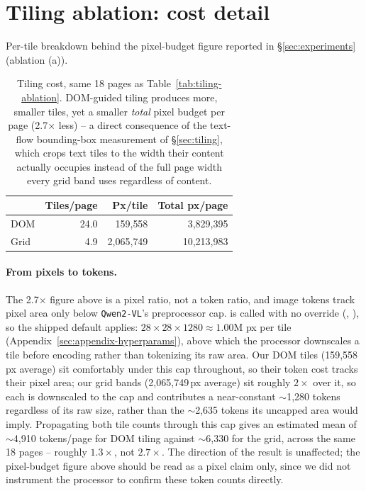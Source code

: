 \section{Tiling ablation: cost detail}
\label{sec:appendix-tiling-cost}

Per-tile breakdown behind the pixel-budget figure reported in \S\ref{sec:experiments} (ablation (a)).

\begin{table}[h]
\centering
\small
\begin{tabular}{@{}lrrr@{}}
\toprule
 & Tiles/page & Px/tile & Total px/page \\
\midrule
DOM  & 24.0 & 159{,}558 & 3{,}829{,}395 \\
Grid & 4.9  & 2{,}065{,}749 & 10{,}213{,}983 \\
\bottomrule
\end{tabular}
\caption{Tiling cost, same 18 pages as Table~\ref{tab:tiling-ablation}. DOM-guided tiling produces more, smaller tiles, yet a smaller \emph{total} pixel budget per page (2.7$\times$ less) -- a direct consequence of the text-flow bounding-box measurement of \S\ref{sec:tiling}, which crops text tiles to the width their content actually occupies instead of the full page width every grid band uses regardless of content.}
\label{tab:appendix-tiling-cost}
\end{table}

\paragraph{From pixels to tokens.} The 2.7$\times$ figure above is a pixel ratio, not a token ratio, and image tokens track pixel area only below \texttt{Qwen2-VL}'s preprocessor cap.  is called with no  override (, ), so the shipped default applies: $28\times28\times1280\approx1.00$M px per tile (Appendix~\ref{sec:appendix-hyperparams}), above which the processor downscales a tile before encoding rather than tokenizing its raw area. Our DOM tiles (159{,}558\,px average) sit comfortably under this cap throughout, so their token cost tracks their pixel area; our grid bands (2{,}065{,}749\,px average) sit roughly $2\times$ over it, so each is downscaled to the cap and contributes a near-constant $\sim$1{,}280 tokens regardless of its raw size, rather than the $\sim$2{,}635 tokens its uncapped area would imply. Propagating both tile counts through this cap gives an estimated mean of $\sim$4{,}910 tokens/page for DOM tiling against $\sim$6{,}330 for the grid, across the same 18 pages -- roughly $1.3\times$, not $2.7\times$. The direction of the result is unaffected; the pixel-budget figure above should be read as a pixel claim only, since we did not instrument the processor to confirm these token counts directly.

